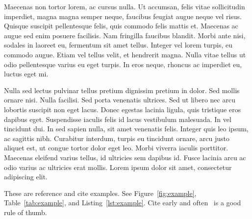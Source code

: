 Maecenas non tortor lorem, ac cursus nulla. Ut accumsan, felis vitae sollicitudin imperdiet, magna magna semper neque, faucibus feugiat augue neque vel risus. Quisque suscipit pellentesque felis, quis commodo felis mattis et. Maecenas ac augue sed enim posuere facilisis. Nam fringilla faucibus blandit. Morbi ante nisi, sodales in laoreet eu, fermentum sit amet tellus. Integer vel lorem turpis, eu commodo augue. Etiam vel tellus velit, et hendrerit magna. Nulla vitae tellus ut odio pellentesque varius eu eget turpis. In eros neque, rhoncus ac imperdiet eu, luctus eget mi.

Nulla sed lectus pulvinar tellus pretium dignissim pretium in dolor. Sed mollis ornare nisi. Nulla facilisi. Sed porta venenatis ultrices. Sed ut libero nec arcu lobortis suscipit non eget lacus. Donec egestas lacinia ligula, quis tristique eros dapibus eget. Suspendisse iaculis felis id lacus vestibulum malesuada. In vel tincidunt dui. In sed sapien nulla, sit amet venenatis felis. Integer quis leo ipsum, ac sagittis nibh. Curabitur interdum, turpis eu tincidunt ornare, arcu justo aliquet est, ut congue tortor dolor eget leo. Morbi viverra iaculis porttitor. Maecenas eleifend varius tellus, id ultricies sem dapibus id. Fusce lacinia arcu ac odio varius ac ultricies erat mollis. Lorem ipsum dolor sit amet, consectetur adipiscing elit. 

These are reference and cite examples. See Figure~\ref{fig:example}, Table~\ref{tab:example}, and Listing~\ref{lst:example}. Cite early and often~\cite{exampleentry} is a good rule of thumb.
